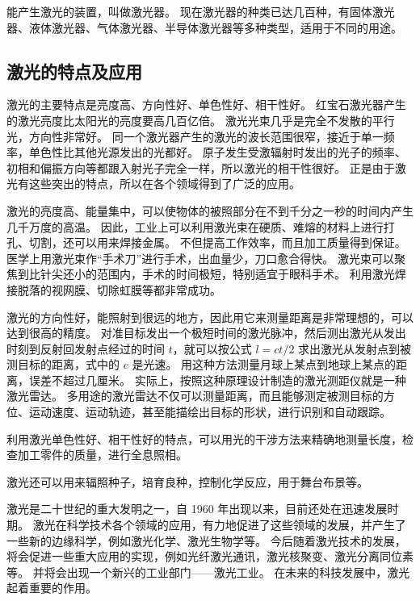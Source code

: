 能产生激光的装置，叫做激光器。
现在激光器的种类已达几百种，有固体激光器、液体激光器、气体激光器、半导体激光器等多种类型，适用于不同的用途。

\subsection{激光的特点及应用}
激光的主要特点是亮度高、方向性好、单色性好、相干性好。
红宝石激光器产生的激光亮度比太阳光的亮度要高几百亿倍。
激光光束几乎是完全不发散的平行光，方向性非常好。
同一个激光器产生的激光的波长范围很窄，接近于单一频率，单色性比其他光源发出的光都好。
原子发生受激辐射时发出的光子的频率、初相和偏振方向等都跟入射光子完全一样，所以激光的相干性很好。
正是由于激光有这些突出的特点，所以在各个领域得到了广泛的应用。

激光的亮度高、能量集中，可以使物体的被照部分在不到千分之一秒的时间内产生几千万度的高温。
因此，工业上可以利用激光束在硬质、难熔的材料上进行打孔、切割，还可以用来焊接金属。
不但提高工作效率，而且加工质量得到保证。
医学上用激光束作“手术刀”进行手术，出血量少，刀口愈合得快。
激光束可以聚焦到比针尖还小的范围内，手术的时间极短，特别适宜于眼科手术。
利用激光焊接脱落的视网膜、切除虹膜等都非常成功。

激光的方向性好，能照射到很远的地方，因此用它来测量距离是非常理想的，可以达到很高的精度。
对准目标发出一个极短时间的激光脉冲，然后测出激光从发出时刻到反射回发射点经过的时间 $t$，就可以按公式 $l=ct/2$ 求出激光从发射点到被测目标的距离，式中的 $c$ 是光速。
用这种方法测量月球上某点到地球上某点的距离，误差不超过几厘米。
实际上，按照这种原理设计制造的激光测距仪就是一种激光雷达。
多用途的激光雷达不仅可以测量距离，而且能够测定被测目标的方位、运动速度、运动轨迹，甚至能描绘出目标的形状，进行识别和自动跟踪。

利用激光单色性好、相干性好的特点，可以用光的干涉方法来精确地测量长度，检查加工零件的质量，进行全息照相。

激光还可以用来辐照种子，培育良种，控制化学反应，用于舞台布景等。

激光是二十世纪的重大发明之一，自 1960 年出现以来，目前还处在迅速发展时期。
激光在科学技术各个领域的应用，有力地促进了这些领域的发展，并产生了一些新的边缘科学，例如激光化学、激光生物学等。
今后随着激光技术的发展，将会促进一些重大应用的实现，例如光纤激光通讯，激光核聚变、激光分离同位素等。
并将会出现一个新兴的工业部门——激光工业。
在未来的科技发展中，激光起着重要的作用。

